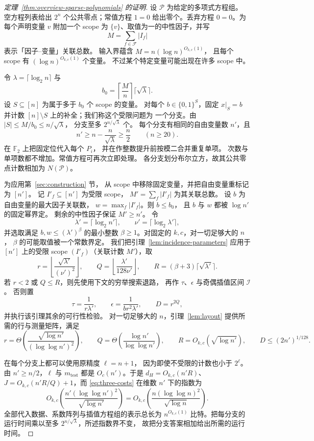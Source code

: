\documentclass[11pt,reqno]{amsart}
\numberwithin{equation}{section}
\theoremstyle{definition}\newtheorem{definition}[theorem]{定义}
\theoremstyle{remark}\newtheorem{remark}[theorem]{注}
\renewcommand{\le}{\leqslant}
\renewcommand{\ge}{\geqslant}
\begin{document}
\begin{proof}[定理~\ref{thm:overview-sparse-polynomials} 的证明]
设 $\mathcal P$ 为给定的多项式方程组。
空方程列表给出 $2^n$ 个公共零点；常值方程 $1=0$
给出零个。丢弃方程 $0=0$。为每个声明变量 $v$
附加一个 scope 为 $\{v\}$、取值为一的中性因子，并写
\[
 M=\sum_{f\in\mathcal F}|I_f|
\]
表示「因子--变量」关联总数。
输入界蕴含 $M=n(\log n)^{O_{k,c}(1)}$，
且每个 scope 有 $(\log n)^{O_{k,c}(1)}$ 个变量。
不过某个特定变量可能出现在许多 scope 中。

令 $\lambda=\lceil\log_2 n\rceil$ 与
\[
 b_0=\left\lceil\frac Mn\right\rceil\lceil\sqrt\lambda\rceil.
\]
设 $S\subseteq[n]$ 为属于多于 $b_0$ 个 scope 的变量。
对每个 $b\in\{0,1\}^S$，固定 $x|_S=b$
并计数 $[n]\setminus S$ 上的补全；我们称这个受限问题为
一个分支。由 $|S|\le M/b_0\le n/\sqrt\lambda$，
分支至多 $2^{n/\sqrt\lambda}$ 个。
每个分支有相同的自由变量数 $n'$，且
\[
 n'\ge n-\frac n{\sqrt\lambda}\ge\frac n2
 \qquad(n\ge20).
\]
在 $\mathbb F_2$ 上把固定位代入每个 $P_i$，
并在作整数提升前按模二合并重复单项。
次数与单项数都不增加。常值方程可再次立即处理。
各分支划分布尔立方，故其公共零点计数相加为
$N(\mathcal P)$。

为应用第~\ref{sec:construction} 节，
从 scope 中移除固定变量，并把自由变量重标记为 $[n']$。
记 $I'_f\subseteq[n']$ 为受限 scope，
$M'=\sum_f|I'_f|$ 为其关联总数。
设 $b$ 为自由变量的最大因子关联数，
$w=\max_f|I'_f|$。则 $b\le b_0$，
且 $b$ 与 $w$ 都被 $\log n'$ 的固定幂界定。
剩余的中性因子保证 $M'\ge n'$。
令
\[
 \lambda'=\lceil\log_2 n'\rceil,\qquad
 \nu'=\lceil\log_2\lambda'\rceil,
\]
并选取满足 $b,w\le(\lambda')^\beta$ 的最小整数
$\beta\ge1$。对固定的 $k,c$，对一切足够大的 $n$，
$\beta$ 的可能取值被一个常数界定。
我们把引理~\ref{lem:incidence-parameters} 应用于
$[n']$ 上的受限 scope $(I'_f)$（关联计数 $M'$），取
\[
 r=\left\lfloor\frac{\sqrt{\lambda'}}{(\nu')^2}\right\rfloor,
 \qquad Q=\left\lfloor\frac{\lambda'}{128\nu'}\right\rfloor,
 \qquad R=(\beta+3)\lceil\sqrt{\lambda'}\rceil.
\]
若 $r<2$ 或 $Q\le R$，则先使用下文的穷举搜索退路，
再作 $\tau$、$\epsilon$ 与奇偶插值区间 $\mathcal I$。
否则置
\[
 \tau=\frac1{r\lambda'},\qquad
 \epsilon=\frac1{br^2\lambda'},\qquad D=r^{2Q},
\]
并执行该引理其余的可行性检验。
对一切足够大的 $n$，引理~\ref{lem:layout}
提供所需的行与测量矩阵，满足
\[
 r=\Theta\!\left(\frac{\sqrt{\log n'}}{(\log\log n')^2}\right),
 \qquad Q=\Theta\!\left(\frac{\log n'}{\log\log n'}\right),
 \qquad R=O_{k,c}(\sqrt{\log n'}),
 \qquad D\le(2n')^{1/128}.
\]

在每个分支上都可以使用原精度 $\ell=n+1$，
因为即使不受限的计数也小于 $2^\ell$。
由 $n'\ge n/2$，$\ell$ 与 $m_{\mathrm{test}}$
都是 $O_c(n')$。于是 $d_H=O_{k,c}(n'R)$、
$J=O_{k,c}(n'R/Q)+1$，而 \eqref{eq:three-costs}
在维数 $n'$ 下的指数为
\[
 O_{k,c}\!\left(\frac{n'(\log\log n')^2}{\sqrt{\log n'}}\right)
 =O_{k,c}\!\left(\frac{n(\log\log n)^2}{\sqrt{\log n}}\right).
\]
全部代入数据、系数阵列与插值方程组的表示总长为
$n^{O_{k,c}(1)}$ 比特。把每分支的运行时间乘以至多
$2^{n/\sqrt\lambda}$，所述指数界不变，
故把分支答案相加给出所需的运行时间。


\end{proof}
\end{document}
